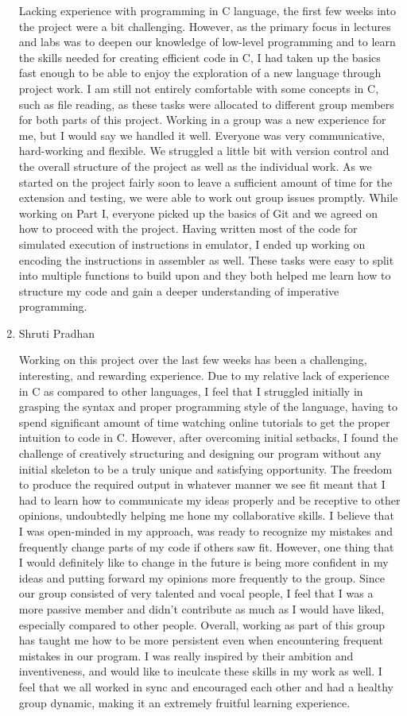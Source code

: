 \documentclass[11pt, letterpaper]{article}
\begin{document}
\begin{enumerate}
Lacking experience with programming in C language, the first few weeks into the project were a bit challenging. However, as the primary focus in lectures and labs was to deepen our knowledge of low-level programming and to learn the skills needed for creating efficient code in C, I had taken up the basics fast enough to be able to enjoy the exploration of a new language through project work. I am still not entirely comfortable with some concepts in C, such as file reading, as these tasks were allocated to different group members for both parts of this project.
Working in a group was a new experience for me, but I would say we handled it well. Everyone was very communicative, hard-working and flexible. We struggled a little bit with version control and the overall structure of the project as well as the individual work. As we started on the project fairly soon to leave a sufficient amount of time for the extension and testing, we were able to work out group issues promptly. While working on Part I, everyone picked up the basics of Git and we agreed on how to proceed with the project. 
Having written most of the code for simulated execution of instructions in emulator, I ended up working on encoding the instructions in assembler as well. These tasks were easy to split into multiple functions to build upon and they both helped me learn how to structure my code and gain a deeper understanding of imperative programming.

\item Shruti Pradhan

Working on this project over the last few weeks has been a challenging, interesting, and rewarding experience. Due to my relative lack of experience in C as compared to other languages, I feel that I struggled initially in grasping the syntax and proper programming style of the language, having to spend significant amount of time watching online tutorials to get the proper intuition to code in C. However, after overcoming initial setbacks, I found the challenge of creatively structuring and designing our program without any initial skeleton to be a truly unique and satisfying opportunity. The freedom to produce the required output in whatever manner we see fit meant that I had to learn how to communicate my ideas properly and be receptive to other opinions, undoubtedly helping me hone my collaborative skills. I believe that I was open-minded in my approach, was ready to recognize my mistakes and frequently change parts of my code if others saw fit. However, one thing that I would definitely like to change in the future is being more confident in my ideas and putting forward my opinions more frequently to the group. Since our group consisted of very talented and vocal people, I feel that I was a more passive member and didn't contribute as much as I would have liked, especially compared to other people. Overall, working as part of this group has taught me how to be more persistent even when encountering frequent mistakes in our program. I was really inspired by their ambition and inventiveness, and would like to inculcate these skills in my work as well. I feel that we all worked in sync and encouraged each other and had a healthy group dynamic, making it an extremely fruitful learning experience.

\end{enumerate}
\end{document}

